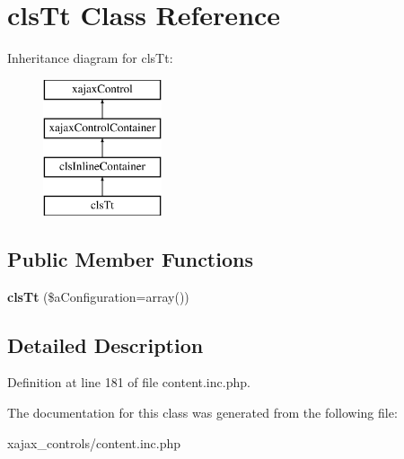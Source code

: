 \hypertarget{classclsTt}{
\section{clsTt Class Reference}
\label{classclsTt}
}
Inheritance diagram for clsTt:\begin{figure}[H]
\begin{center}
\leavevmode
\includegraphics[height=4.000000cm]{classclsTt}
\end{center}
\end{figure}
\subsection*{Public Member Functions}
\begin{DoxyCompactItemize}
\item 
\hypertarget{classclsTt_ab02cf244fae0ac4990e7f94dd555cb8e}{
{\bfseries clsTt} (\$aConfiguration=array())}
\label{classclsTt_ab02cf244fae0ac4990e7f94dd555cb8e}

\end{DoxyCompactItemize}


\subsection{Detailed Description}


Definition at line 181 of file content.inc.php.



The documentation for this class was generated from the following file:\begin{DoxyCompactItemize}
\item 
xajax\_\-controls/content.inc.php\end{DoxyCompactItemize}
